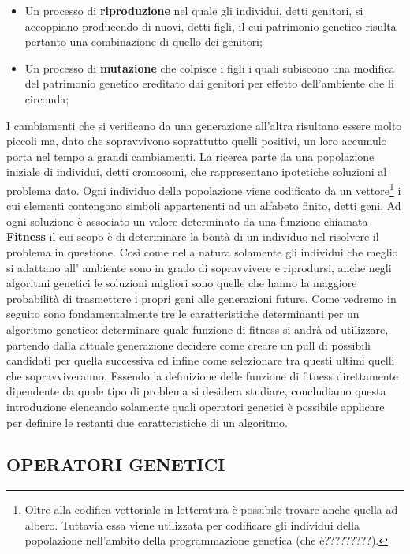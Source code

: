 \documentclass[11pt]{article}
\begin{document}
\begin{itemize}
    \item Un processo di \textbf{riproduzione} nel quale gli individui, detti genitori, si accoppiano producendo di nuovi, detti figli, il cui patrimonio genetico risulta pertanto una combinazione di quello dei genitori;
    \item Un processo di \textbf{mutazione} che colpisce i figli i quali subiscono una modifica del patrimonio genetico ereditato dai genitori per effetto dell'ambiente che li circonda;
\end{itemize}

I cambiamenti che si verificano da una generazione all'altra risultano essere molto piccoli ma, dato che sopravvivono soprattutto quelli positivi, un loro accumulo porta nel tempo a grandi cambiamenti.
La ricerca parte da una popolazione iniziale di individui, detti cromosomi, che rappresentano ipotetiche soluzioni al problema dato. Ogni individuo della popolazione viene codificato da un vettore\footnote{Oltre alla codifica vettoriale in letteratura è possibile trovare anche quella ad albero. Tuttavia essa viene utilizzata per codificare gli individui della popolazione nell'ambito della programmazione genetica (che è?????????).} i cui elementi contengono simboli appartenenti ad un alfabeto finito, detti geni. Ad ogni soluzione è associato un valore determinato da una funzione chiamata \textbf{Fitness} il cui scopo è di determinare la bontà di un individuo nel risolvere il problema in questione.
Così come nella natura solamente gli individui che meglio si adattano all' ambiente sono in grado di sopravvivere e riprodursi, anche negli algoritmi genetici le soluzioni migliori sono quelle che hanno la maggiore probabilità di trasmettere i propri geni alle generazioni future.
Come vedremo in seguito sono fondamentalmente tre le caratteristiche determinanti per un algoritmo genetico: determinare quale funzione di fitness si andrà ad utilizzare, partendo dalla attuale generazione decidere come creare un pull di possibili candidati per quella successiva ed infine come selezionare tra questi ultimi quelli che sopravviveranno.
Essendo la definizione delle funzione di fitness direttamente dipendente da quale tipo di problema si desidera studiare, concludiamo questa introduzione elencando solamente quali operatori genetici è possibile applicare per definire le restanti due caratteristiche di un algoritmo.

\subsection*{OPERATORI GENETICI}
\end{document}
